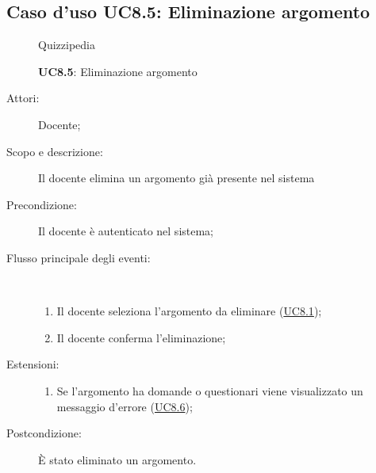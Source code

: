 \subsection{Caso d'uso UC8.5: Eliminazione argomento}
	\begin{figure}[H]
		\centering
		\begin{resizedtikzpicture}{\textwidth}
		\begin{umlsystem}[x=0, fill=lightgray!20]{Quizzipedia}
		\end{umlsystem}
		\end{resizedtikzpicture}
		\caption{\textbf{UC8.5}: Eliminazione argomento}
		\label{UC8.5}
	\end{figure}
\begin{description}
\item[Attori:] Docente;
\item[Scopo e descrizione:] Il docente elimina un argomento già presente nel sistema
      \item[Precondizione:] Il docente è autenticato nel sistema;

        \item[Flusso principale degli eventi:] \ 
 \begin{enumerate}
          \item Il docente seleziona l'argomento da eliminare (\hyperlink{UC8.1}{UC8.1});
          \item Il docente conferma l'eliminazione;

      \end{enumerate}
    \item[Estensioni:]
      \begin{enumerate}
          \item Se l'argomento ha domande o questionari viene visualizzato un messaggio d'errore (\hyperlink{UC8.6}{UC8.6});

      \end{enumerate}
    \item[Postcondizione:] È stato eliminato un argomento.
  \end{description}
\hypertarget{UC8.6}{}
